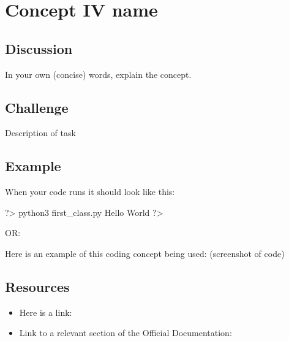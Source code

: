 \documentclass{42-en}
\begin{document}

\nextexercice
\chapter{Concept IV name}

\section{Discussion}

In your own (concise) words, explain the concept.

\section{Challenge}


\makeheaderfiles
Description of task

\section{Example}
When your code runs it should look like this: 

\begin{42console}
	?> python3 first_class.py
	Hello World
	?>
\end{42console}

OR:

Here is an example of this coding concept being used: (screenshot of code)

\section{Resources}
\begin{itemize}
	\item Here is a link:
    \item Link to a relevant section of the Official Documentation:
\end{itemize}

\end{document}
